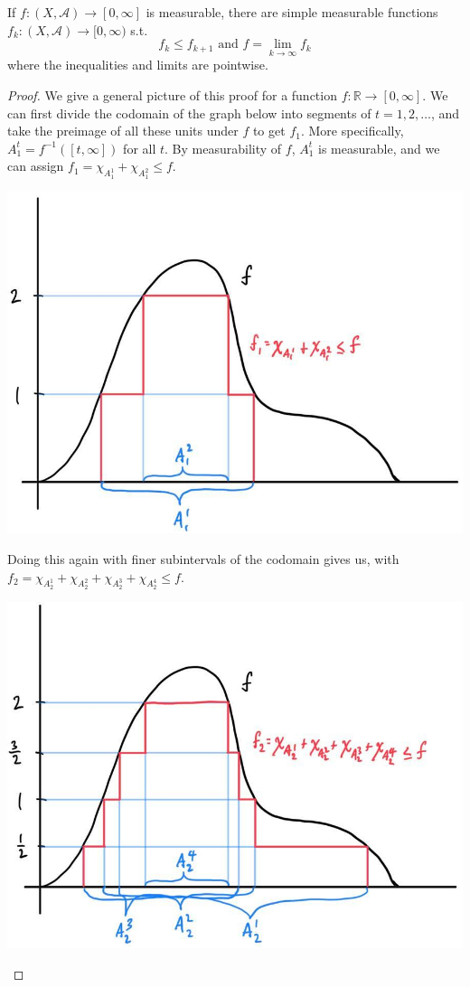 \documentclass{article}
\begin{document}
\begin{theorem}
  If $f: (X, \mathcal{A}) \longrightarrow [0, \infty]$ is measurable, there are simple measurable functions $f_k : (X, \mathcal{A}) \longrightarrow [0, \infty)$ s.t. 
  \[f_k \leq f_{k+1} \text{ and } f = \lim_{k \rightarrow \infty} f_k\]
  where the inequalities and limits are pointwise. 
\end{theorem}
\begin{proof}
  We give a general picture of this proof for a function $f: \mathbb{R} \longrightarrow [0, \infty]$. We can first divide the codomain of the graph below into segments of $t = 1, 2, \ldots$, and take the preimage of all these units under $f$ to get $f_1$. More specifically, $A_1^t = f^{-1} ([t, \infty])$ for all $t$. By measurability of $f$, $A_1^t$ is measurable, and we can assign $f_1 = \chi_{A^1_1} + \chi_{A_1^2} \leq f$. 
  \begin{center}
      \includegraphics[scale=0.23]{img/Lebesgue_1.jpg}
  \end{center}
  Doing this again with finer subintervals of the codomain gives us, with $f_2 = \chi_{A_2^1} + \chi_{A_2^2} + \chi_{A_2^3} + \chi_{A_2^4} \leq f$. 
  \begin{center}
      \includegraphics[scale=0.23]{img/Lebesgue_2.jpg}

\end{center}
\end{proof}
\end{document}
